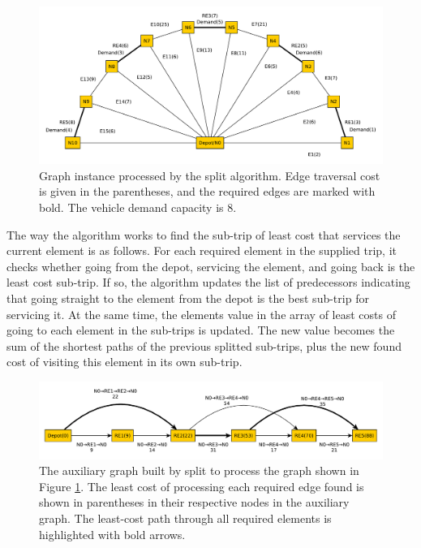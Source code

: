 \begin{figure}[thbp]
    \centerline{\includegraphics[width=\textwidth]{figures/SplitIllustrations/Split_GraphWithShortestPathsPlain.pdf}}
    \caption{Graph instance processed by the split algorithm. Edge traversal cost is given in the parentheses, and the required edges are marked with bold. The vehicle demand capacity is 8.}
    \label{fig:sgwspp}
\end{figure}

The way the algorithm works to find the sub-trip of least cost that services the current element is as follows. For each required element in the supplied trip, it checks whether going from the depot, servicing the element, and going back is the least cost sub-trip. If so, the algorithm updates the list of predecessors indicating that going straight to the element from the depot is the best sub-trip for servicing it. At the same time, the elements value in the array of least costs of going to each element in the sub-trips is updated. The new value becomes the sum of the shortest paths of the previous splitted sub-trips, plus the new found cost of visiting this element in its own sub-trip.

\begin{figure}[thbp]
    \centerline{\includegraphics[width=\textwidth]{figures/SplitIllustrations/Split_AuxiliaryGraph.pdf}}
    \caption{The auxiliary graph built by split to process the graph shown in Figure \ref{fig:sgwspp}. The least cost of processing each required edge found is shown in parentheses in their respective nodes in the auxiliary graph. The least-cost path through all required elements is highlighted with bold arrows.}
    \label{fig:sag}
\end{figure}

